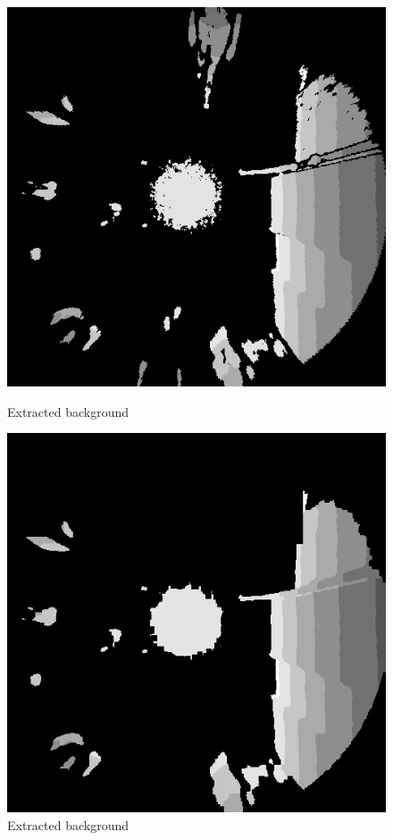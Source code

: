 \documentclass[conference]{IEEEtran}
\begin{document}
\begin{figure}[ht!]
    \centering
    \begin{minipage}[b]{0.4\textwidth}
        \centering
        \includegraphics[width=\textwidth]{Images/classical/112.png}
        \caption{Extracted background}\label{fig:NetRes3}
    \end{minipage}
    \hfill
    \begin{minipage}[b]{0.4\textwidth}
        \centering
        \includegraphics[width=\textwidth]{Images/classical/backgroung.png}
        \caption{Extracted background}\label{fig:NetRes3}
    \end{minipage}
\end{figure}
\end{document}
